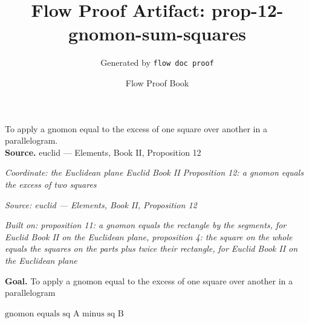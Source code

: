 \documentclass[11pt]{article}
\title{Flow Proof Artifact: prop-12-gnomon-sum-squares}
\author{Generated by \texttt{flow doc proof}}
\date{Flow Proof Book}
\theoremstyle{definition}
\begin{document}
\maketitle
To apply a gnomon equal to the excess of one square over another in a parallelogram.\\[0.5em]
\textbf{Source.} euclid — Elements, Book II, Proposition 12\\[0.5em]
\bigskip
{}\par
\smallskip\noindent\textit{Coordinate: the Euclidean plane \cdot Euclid Book II \cdot Proposition 12: a gnomon equals the excess of two squares}\par
\smallskip\noindent\textit{Source: euclid — Elements, Book II, Proposition 12}\par
\smallskip\noindent\textit{Built on: proposition 11: a gnomon equals the rectangle by the segments, for Euclid Book II on the Euclidean plane, proposition 4: the square on the whole equals the squares on the parts plus twice their rectangle, for Euclid Book II on the Euclidean plane}\par
\medskip
\noindent\textbf{Goal.} To apply a gnomon equal to the excess of one square over another in a parallelogram\par
\noindent$\displaystyle \text{gnomon equals sq A minus sq B}$\par
\medskip
\noindent
\end{document}

